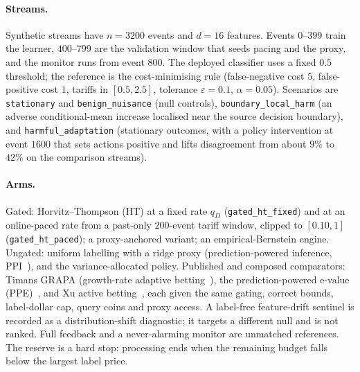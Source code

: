 \paragraph{Streams.}
Synthetic streams have $n=3200$ events and $d=16$ features. Events $0$--$399$ train the learner, $400$--$799$ are the validation window that seeds pacing and the proxy, and the monitor runs from event $800$.
The deployed classifier uses a fixed $0.5$ threshold; the reference is the cost-minimising rule
(false-negative cost $5$, false-positive cost $1$, tariffs in $[0.5,2.5]$, tolerance $\varepsilon=0.1$, $\alpha=0.05$).
Scenarios are \texttt{stationary} and \texttt{benign\_nuisance} (null controls), \texttt{boundary\_local\_harm}
(an adverse conditional-mean increase localised near the source decision boundary), and \texttt{harmful\_adaptation}
(stationary outcomes, with a policy intervention at event $1600$ that sets actions positive and lifts disagreement from about $9\%$ to $42\%$ on the comparison streams).

\paragraph{Arms.}
Gated: Horvitz--Thompson (HT) at a fixed rate $q_D$ (\texttt{gated\_ht\_fixed}) and at an online-paced rate from a past-only $200$-event tariff window,
clipped to $[0.10,1]$ (\texttt{gated\_ht\_paced}); a proxy-anchored variant; an empirical-Bernstein engine.
Ungated: uniform labelling with a ridge proxy (prediction-powered inference, PPI~\citep{angelopoulos2023ppi}), and the variance-allocated policy.
Published and composed comparators: Timans GRAPA (growth-rate adaptive betting~\citep{waudbysmith2024}), the prediction-powered e-value (PPE)~\citep{csillag2025}, and Xu active betting~\citep{xu2024active},
each given the same gating, correct bounds, label-dollar cap, query coins and proxy access.
A label-free feature-drift sentinel is recorded as a distribution-shift diagnostic; it targets a different null and is not ranked.
Full feedback and a never-alarming monitor are unmatched references.
The reserve is a hard stop: processing ends when the remaining budget falls below the largest label price.

